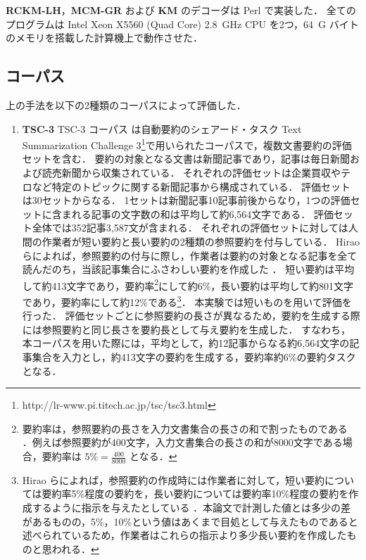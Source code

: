 \documentclass[japanese]{jnlp_1.4}
\begin{document}
{\bf RCKM-LH}，{\bf MCM-GR} および {\bf KM} のデコーダは Perl で実装した．
全てのプログラムは Intel Xeon X5560 (Quad Core) 2.8~GHz CPU を2つ，64~G バイトのメモリを搭載した計算機上で動作させた．



\subsection{コーパス}
\label{corpora}

上の手法を以下の2種類のコーパスによって評価した．

\begin{enumerate}
\item {\bf TSC-3}\hspace{1zw}
TSC-3 コーパス \cite{hirao04} は自動要約のシェアード・タスク Text Summarization Challenge 3\footnote{http://lr-www.pi.titech.ac.jp/tsc/tsc3.html}で用いられたコーパスで，複数文書要約の評価セットを含む．
要約の対象となる文書は新聞記事であり，記事は毎日新聞および読売新聞から収集されている．
それぞれの評価セットは企業買収やテロなど特定のトピックに関する新聞記事から構成されている．
評価セットは30セットからなる．
1セットは新聞記事10記事前後からなり，1つの評価セットに含まれる記事の文字数の和は平均して約6,564文字である．
評価セット全体では352記事3,587文が含まれる．
それぞれの評価セットに対しては人間の作業者が短い要約と長い要約の2種類の参照要約を付与している．
Hirao らによれば，参照要約の付与に際し，作業者は要約の対象となる記事を全て読んだのち，当該記事集合にふさわしい要約を作成した \cite{hirao04}．
短い要約は平均して約413文字であり，要約率\footnote{要約率は，参照要約の長さを入力文書集合の長さの和で割ったものである \protect \cite{okumura05}．例えば参照要約が400文字，入力文書集合の長さの和が8000文字である場合，要約率は $ 5\% = \frac{400}{8000} $ となる．}にして約6\%，長い要約は平均して約801文字であり，要約率にして約12\%である\footnote{Hirao らによれば，参照要約の作成時には作業者に対して，短い要約については要約率5\%程度の要約を，長い要約については要約率10\%程度の要約を作成するように指示を与えたとしている \cite{hirao04}．本論文で計測した値とは多少の差があるものの，5\%，10\%という値はあくまで目処として与えたものであると述べられているため，作業者はこれらの指示より多少長い要約を作成したものと思われる．}．
本実験では短いものを用いて評価を行った．
評価セットごとに参照要約の長さが異なるため，要約を生成する際には参照要約と同じ長さを要約長として与え要約を生成した．
すなわち，本コーパスを用いた際には，平均として，約12記事からなる約6,564文字の記事集合を入力とし，約413文字の要約を生成する，要約率約6\%の要約タスクとなる．

\end{enumerate}
\end{document}
